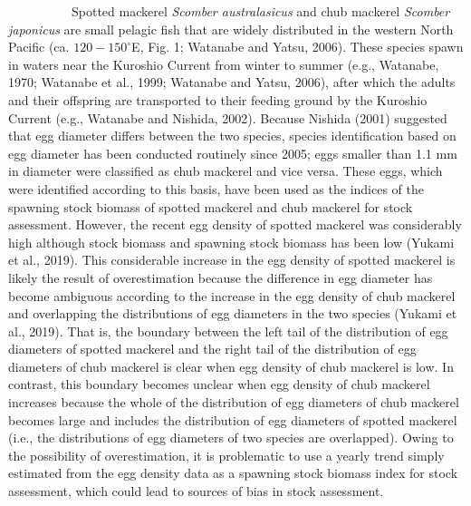 \documentclass[12pt]{article}
\begin{document}
\begin{linenumbers}
\ \ \ \ \ \ \ \ \ \ 
Spotted mackerel \textit{Scomber australasicus} and chub mackerel \textit{Scomber japonicus} are small pelagic fish that are widely distributed in the western North Pacific (ca. $\textrm{120}-\textrm{150}^{\circ}$E, Fig. 1; Watanabe and Yatsu, 2006). These species spawn in waters near the Kuroshio Current from winter to summer (e.g., Watanabe, 1970; Watanabe et al., 1999; Watanabe and Yatsu, 2006), after which the adults and their offspring are transported to their feeding ground by the Kuroshio Current (e.g., Watanabe and Nishida, 2002). Because Nishida (2001) suggested that egg diameter differs between the two species, species identification based on egg diameter has been conducted routinely since 2005; eggs smaller than 1.1 mm in diameter were classified as chub mackerel and vice versa. These eggs, which were identified according to this basis, have been used as the indices of the spawning stock biomass of spotted mackerel and chub mackerel for stock assessment. However, the recent egg density of spotted mackerel was considerably high although stock biomass and spawning stock biomass has been low (Yukami et al., 2019). This considerable increase in the egg density of spotted mackerel is likely the result of overestimation because the difference in egg diameter has become ambiguous according to the increase in the egg density of chub mackerel and overlapping the distributions of egg diameters in the two species (Yukami et al., 2019). That is, the boundary between the left tail of the distribution of egg diameters of spotted mackerel and the right tail of the distribution of egg diameters of chub mackerel is clear when egg density of chub mackerel is low. In contrast, this boundary becomes unclear when egg density of chub mackerel increases because the whole of the distribution of egg diameters of chub mackerel becomes large and includes the distribution of egg diameters of spotted mackerel (i.e., the distributions of egg diameters of two species are overlapped). Owing to the possibility of overestimation, it is problematic to use a yearly trend simply estimated from the egg density data as a spawning stock biomass index for stock assessment, which could lead to sources of bias in stock assessment.


\end{linenumbers}
\end{document}
